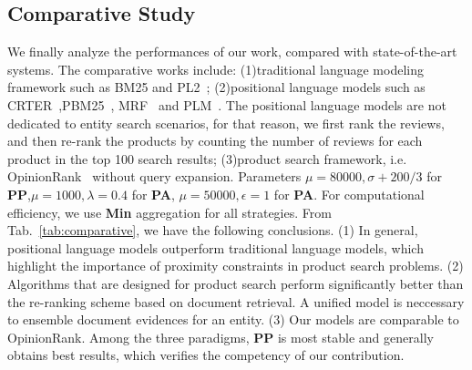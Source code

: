 \documentclass[preprint]{elsarticle}
\begin{document}
\subsection{Comparative Study}
We finally analyze the performances of our work, compared with state-of-the-art systems. The comparative works include: (1)traditional language modeling framework such as BM25 and PL2~\cite{Ounis2006Terrier}; (2)positional language models such as CRTER~\cite{Zhao2014Modeling},PBM25~\cite{He2011Modeling}, MRF~\cite{Metzler2005Markov} and PLM~\cite{Lv2009Positional}. The positional language models are not dedicated to entity search scenarios, for that reason, we first rank the reviews, and then re-rank the products by counting the number of reviews for each product in the top 100 search results; (3)product search framework, i.e. OpinionRank~\cite{Ganesan2012Opinion} without query expansion. Parameters $\mu=80000,\sigma+200/3$ for \textbf{PP},$\mu=1000,\lambda=0.4$ for \textbf{PA}, $\mu=50000,\epsilon=1$ for \textbf{PA}. For computational efficiency, we use \textbf{Min} aggregation for all strategies. From Tab.~\ref{tab:comparative}, we have the following conclusions. (1) In general, positional language models outperform traditional language models, which highlight the importance of proximity constraints in product search problems. (2) Algorithms that are designed for product search perform significantly better than the re-ranking scheme based on document retrieval. A unified model is neccessary to ensemble document evidences for an entity. (3) Our models are comparable to OpinionRank. Among the three paradigms, \textbf{PP} is most stable and generally obtains best results, which verifies the competency of our contribution.
\end{document}
